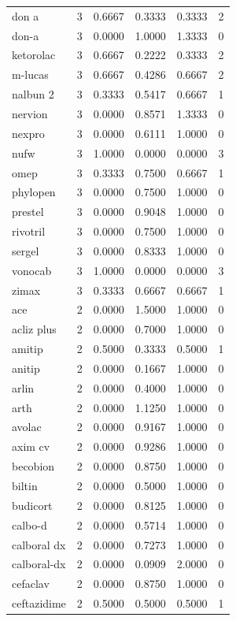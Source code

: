 \begin{longtable}{p{3.0cm}rrrrr}
don a & 3 & 0.6667 & 0.3333 & 0.3333 & 2 \\
don-a & 3 & 0.0000 & 1.0000 & 1.3333 & 0 \\
ketorolac & 3 & 0.6667 & 0.2222 & 0.3333 & 2 \\
m-lucas & 3 & 0.6667 & 0.4286 & 0.6667 & 2 \\
nalbun 2 & 3 & 0.3333 & 0.5417 & 0.6667 & 1 \\
nervion & 3 & 0.0000 & 0.8571 & 1.3333 & 0 \\
nexpro & 3 & 0.0000 & 0.6111 & 1.0000 & 0 \\
nufw & 3 & 1.0000 & 0.0000 & 0.0000 & 3 \\
omep & 3 & 0.3333 & 0.7500 & 0.6667 & 1 \\
phylopen & 3 & 0.0000 & 0.7500 & 1.0000 & 0 \\
prestel & 3 & 0.0000 & 0.9048 & 1.0000 & 0 \\
rivotril & 3 & 0.0000 & 0.7500 & 1.0000 & 0 \\
sergel & 3 & 0.0000 & 0.8333 & 1.0000 & 0 \\
vonocab & 3 & 1.0000 & 0.0000 & 0.0000 & 3 \\
zimax & 3 & 0.3333 & 0.6667 & 0.6667 & 1 \\
ace & 2 & 0.0000 & 1.5000 & 1.0000 & 0 \\
acliz plus & 2 & 0.0000 & 0.7000 & 1.0000 & 0 \\
amitip & 2 & 0.5000 & 0.3333 & 0.5000 & 1 \\
anitip & 2 & 0.0000 & 0.1667 & 1.0000 & 0 \\
arlin & 2 & 0.0000 & 0.4000 & 1.0000 & 0 \\
arth & 2 & 0.0000 & 1.1250 & 1.0000 & 0 \\
avolac & 2 & 0.0000 & 0.9167 & 1.0000 & 0 \\
axim cv & 2 & 0.0000 & 0.9286 & 1.0000 & 0 \\
becobion & 2 & 0.0000 & 0.8750 & 1.0000 & 0 \\
biltin & 2 & 0.0000 & 0.5000 & 1.0000 & 0 \\
budicort & 2 & 0.0000 & 0.8125 & 1.0000 & 0 \\
calbo-d & 2 & 0.0000 & 0.5714 & 1.0000 & 0 \\
calboral dx & 2 & 0.0000 & 0.7273 & 1.0000 & 0 \\
calboral-dx & 2 & 0.0000 & 0.0909 & 2.0000 & 0 \\
cefaclav & 2 & 0.0000 & 0.8750 & 1.0000 & 0 \\
ceftazidime & 2 & 0.5000 & 0.5000 & 0.5000 & 1 \\

\end{longtable}
